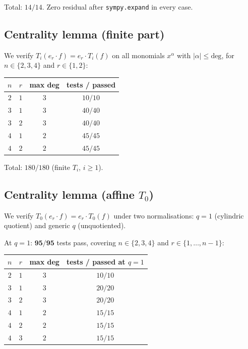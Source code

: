 \documentclass[11pt]{article}
\theoremstyle{definition}
\begin{document}
Total: $14/14$. Zero residual after \texttt{sympy.expand} in every case.

\subsection{Centrality lemma (finite part)}

We verify $T_i(e_r \cdot f) = e_r \cdot T_i(f)$ on all monomials $x^\alpha$ with
$|\alpha| \le \text{deg}$, for $n \in \{2, 3, 4\}$ and $r \in \{1, 2\}$:

\begin{center}
\begin{tabular}{|c|c|c|c|}
\hline
$n$ & $r$ & max deg & tests / passed \\
\hline
$2$ & $1$ & $3$ & $10 / 10$ \\
$3$ & $1$ & $3$ & $40 / 40$ \\
$3$ & $2$ & $3$ & $40 / 40$ \\
$4$ & $1$ & $2$ & $45 / 45$ \\
$4$ & $2$ & $2$ & $45 / 45$ \\
\hline
\end{tabular}
\end{center}

Total: $180/180$ (finite $T_i$, $i \ge 1$).

\subsection{Centrality lemma (affine $T_0$)}
\label{ssec:t0-centrality}

We verify $T_0(e_r \cdot f) = e_r \cdot T_0(f)$ under two normalisations: $q=1$
(cylindric quotient) and generic $q$ (unquotiented).

At $q = 1$: $\mathbf{95/95}$ tests pass, covering $n \in \{2,3,4\}$ and $r \in \{1,\ldots,n-1\}$:

\begin{center}
\begin{tabular}{|c|c|c|c|}
\hline
$n$ & $r$ & max deg & tests / passed at $q=1$ \\
\hline
$2$ & $1$ & $3$ & $10/10$ \\
$3$ & $1$ & $3$ & $20/20$ \\
$3$ & $2$ & $3$ & $20/20$ \\
$4$ & $1$ & $2$ & $15/15$ \\
$4$ & $2$ & $2$ & $15/15$ \\
$4$ & $3$ & $2$ & $15/15$ \\
\hline
\end{tabular}
\end{center}
\end{document}
